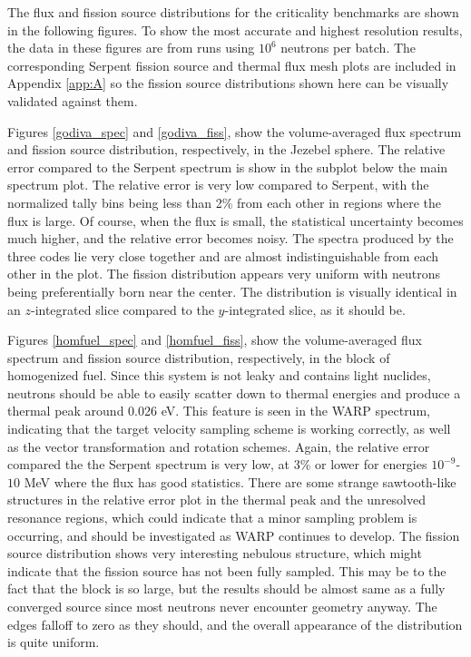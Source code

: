 The flux and fission source distributions for the criticality benchmarks are shown in the following figures.  To show the most accurate and highest resolution results, the data in these figures are from runs using $10^6$ neutrons per batch.  The corresponding Serpent fission source and thermal flux mesh plots are included in Appendix \ref{app:A} so the fission source distributions shown here can be visually validated against them.  

Figures \ref{godiva_spec} and \ref{godiva_fiss}, show the volume-averaged flux spectrum and fission source distribution, respectively, in the Jezebel sphere.  The relative error compared to the Serpent spectrum is show in the subplot below the main spectrum plot.  The relative error is very low compared to Serpent, with the normalized tally bins being less than 2\% from each other in regions where the flux is large.  Of course, when the flux is small, the statistical uncertainty becomes much higher, and the relative error becomes noisy.  The spectra produced by the three codes lie very close together and are almost indistinguishable from each other in the plot.  The fission distribution appears very uniform with neutrons being preferentially born near the center.  The distribution is visually identical in an $z$-integrated slice compared to the $y$-integrated slice, as it should be.

Figures \ref{homfuel_spec} and \ref{homfuel_fiss}, show the volume-averaged flux spectrum and fission source distribution, respectively, in the block of homogenized fuel.  Since this system is not leaky and contains light nuclides, neutrons should be able to easily scatter down to thermal energies and produce a thermal peak around 0.026 eV.  This feature is seen in the WARP spectrum, indicating that the target velocity sampling scheme is working correctly, as well as the vector transformation and rotation schemes.  Again, the relative error compared the the Serpent spectrum is very low, at 3\% or lower for energies $10^{-9}$-$10$ MeV where the flux has good statistics.  There are some strange sawtooth-like structures in the relative error plot in the thermal peak and the unresolved resonance regions, which could indicate that a minor sampling problem is occurring, and should be investigated as WARP continues to develop.  The fission source distribution shows very interesting nebulous structure, which might indicate that the fission source has not been fully sampled.  This may be to the fact that the block is so large, but the results should be almost same as a fully converged source since most neutrons never encounter geometry anyway.  The edges falloff to zero as they should, and the overall appearance of the distribution is quite uniform.

